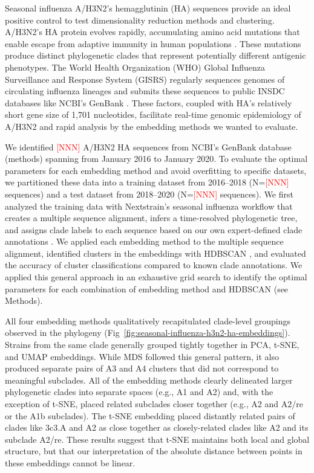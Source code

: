 \documentclass[10pt,letterpaper]{article}
\def\jhc#1{\textcolor{red}{[#1]}}
\begin{document}
Seasonal influenza A/H3N2's hemagglutinin (HA) sequences provide an ideal positive control to test dimensionality reduction methods and clustering.
A/H3N2's HA protein evolves rapidly, accumulating amino acid mutations that enable escape from adaptive immunity in human populations \cite{flu-review}.
These mutations produce distinct phylogenetic clades that represent potentially different antigenic phenotypes.
The World Health Organization (WHO) Global Influenza Surveillance and Response System (GISRS) regularly sequences genomes of circulating influenza lineages \cite{who-gisrs} and submits these sequences to public INSDC databases like NCBI's GenBank \cite{insdc}.
These factors, coupled with HA's relatively short gene size of 1,701 nucleotides, facilitate real-time genomic epidemiology of A/H3N2 \cite{nextflu,nextstrain} and rapid analysis by the embedding methods we wanted to evaluate.

We identified \jhc{NNN} A/H3N2 HA sequences from NCBI's GenBank database (methods) spanning from January 2016 to January 2020.
To evaluate the optimal parameters for each embedding method and avoid overfitting to specific datasets, we partitioned these data into a training dataset from 2016--2018 (N=\jhc{NNN} sequences) and a test dataset from 2018--2020 (N=\jhc{NNN} sequences).
We first analyzed the training data with Nextstrain's seasonal influenza workflow that creates a multiple sequence alignment, infers a time-resolved phylogenetic tree, and assigns clade labels to each sequence based on our own expert-defined clade annotations \cite{nextstrain,seasonal-flu,augur}.
We applied each embedding method to the multiple sequence alignment, identified clusters in the embeddings with HDBSCAN \cite{hdbscan}, and evaluated the accuracy of cluster classifications compared to known clade annotations.
We applied this general approach in an exhaustive grid search to identify the optimal parameters for each combination of embedding method and HDBSCAN (see Methods).

All four embedding methods qualitatively recapitulated clade-level groupings observed in the phylogeny (Fig~\ref{fig:seasonal-influenza-h3n2-ha-embeddings}).
Strains from the same clade generally grouped tightly together in PCA, t-SNE, and UMAP embeddings.
While MDS followed this general pattern, it also produced separate pairs of A3 and A4 clusters that did not correspond to meaningful subclades.
All of the embedding methods clearly delineated larger phylogenetic clades into separate spaces (e.g., A1 and A2) and, with the exception of t-SNE, placed related subclades closer together (e.g., A2 and A2/re or the A1b subclades).
The t-SNE embedding placed distantly related pairs of clades like 3c3.A and A2 as close together as closely-related clades like A2 and its subclade A2/re.
These results suggest that t-SNE maintains both local and global structure, but that our interpretation of the absolute distance between points in these embeddings cannot be linear.
\end{document}
